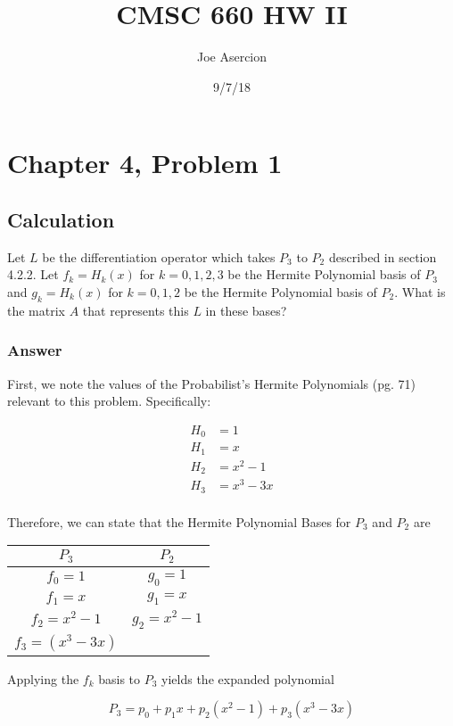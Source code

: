 \documentclass{article}
\title{CMSC 660 HW II}
\date{9/7/18}
\author{Joe Asercion}
\begin{document}
	\maketitle
	\section{Chapter 4, Problem 1}
		\subsection{Calculation}
		Let $L$ be the differentiation operator which takes $P_{3}$ to $P_{2}$ described in section 4.2.2.  Let $f_{k}=H_{k}(x)$ for $k=0,1,2,3$ be the Hermite Polynomial basis of $P_{3}$ and $g_{k}=H_{k}(x)$ for $k=0,1,2$ be the Hermite Polynomial basis of $P_{2}$.  What is the matrix $A$ that represents this $L$ in these bases?
		
		\subsubsection{Answer}
		
		First, we note the values of the Probabilist's Hermite Polynomials \cite{BG}(pg. 71)\cite{wiki_hermite} relevant to this problem.  Specifically:
		
		\begin{align*}
			H_{0}&=1 \\
			H_{1}&=x \\
			H_{2}&=x^{2}-1 \\ 
			H_{3}&=x^{3}-3x \\
		\end{align*}

		Therefore, we can state that the Hermite Polynomial Bases for $P_{3}$ and $P_{2}$ are
		
		\begin{center}
		\begin{tabular}{ c c }
			$P_{3}$ & $P_{2}$ \\
			\hline
			$f_{0}=1$ & $g_{0}=1$ \\
			$f_{1}=x$ & $g_{1}=x$ \\
			$f_{2}=x^{2}-1$ & $g_{2}=x^{2}-1$ \\
			$f_{3}=(x^{3}-3x)$ & 
		\end{tabular}
		\end{center}
		
		Applying the $f_{k}$ basis to $P_{3}$ yields the expanded polynomial 
		
		\begin{center}
			\begin{equation}
				P_{3}=p_{0}+p_{1}x+p_{2}(x^{2}-1)+p_{3}(x^{3}-3x)
			\end{equation}
		\end{center}
		
\end{document}
